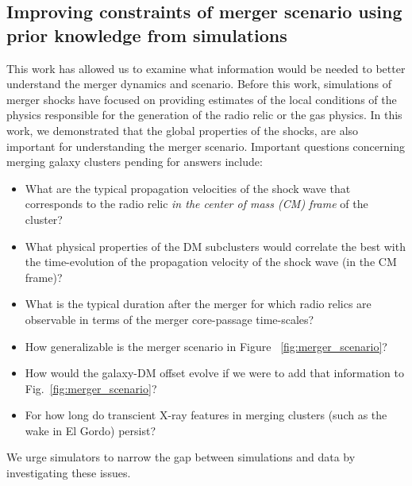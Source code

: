 \subsection{Improving constraints of merger scenario using prior knowledge from simulations}
This work has allowed us to examine
what information would be needed to better understand the merger
dynamics and scenario. Before this work, simulations of merger shocks have
focused on providing estimates of the local conditions of the physics
responsible for the generation of the radio relic or the gas physics. In this work, we demonstrated that the global
properties of the shocks, are also important for understanding the merger scenario. 
Important questions concerning merging galaxy
clusters pending for answers include:  
\begin{itemize}
\item What are the typical propagation velocities of the shock wave that
	corresponds to the radio relic {\it in the center of mass (CM) frame} of the cluster?
\item What physical properties of the DM subclusters would correlate the
	best with the time-evolution of the propagation velocity of the shock
	wave (in the CM frame)?  
\item What is the typical duration
after the merger for which radio relics are observable in terms of the merger
core-passage time-scales? 
\item How generalizable is the merger scenario in Figure
~\ref{fig:merger_scenario}?  
\item How would the galaxy-DM offset evolve if we were to add that information
	to Fig.~\ref{fig:merger_scenario}?
\item For how long do transcient X-ray features in merging clusters (such
		as the wake in El Gordo) persist?
\end{itemize}
We urge simulators to narrow the gap between simulations and data by
investigating these issues.
